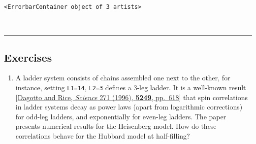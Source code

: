             \begin{tcolorbox}[breakable, size=fbox, boxrule=.5pt, pad at break*=1mm, opacityfill=0]
\begin{Verbatim}[commandchars=\\\{\}]
<ErrorbarContainer object of 3 artists>
\end{Verbatim}
\end{tcolorbox}
        
    \begin{center}
    \end{center}
    { \hspace*{\fill} \\}
    
    \begin{center}\rule{0.5\linewidth}{\linethickness}\end{center}

\hypertarget{exercises}{%
\subsection{Exercises}\label{exercises}}

\begin{enumerate}
\def\labelenumi{\arabic{enumi}.}
\tightlist
\item
  A ladder system consists of chains assembled one next to the other,
  for instance, setting \texttt{L1=14}, \texttt{L2=3} defines a 3-leg
  ladder. It is a well-known result
  {[}\href{doi.org/10.1126/science.271.5249.618}{Dagotto and Rice,
  \emph{Science} 271 (1996), \textbf{5249}, pp.~618}{]} that spin
  correlations in ladder systems decay as power laws (apart from
  logarithmic corrections) for odd-leg ladders, and exponentially for
  even-leg ladders. The paper presents numerical results for the
  Heisenberg model. How do these correlations behave for the Hubbard
  model at half-filling?
\end{enumerate}


    
    
    
